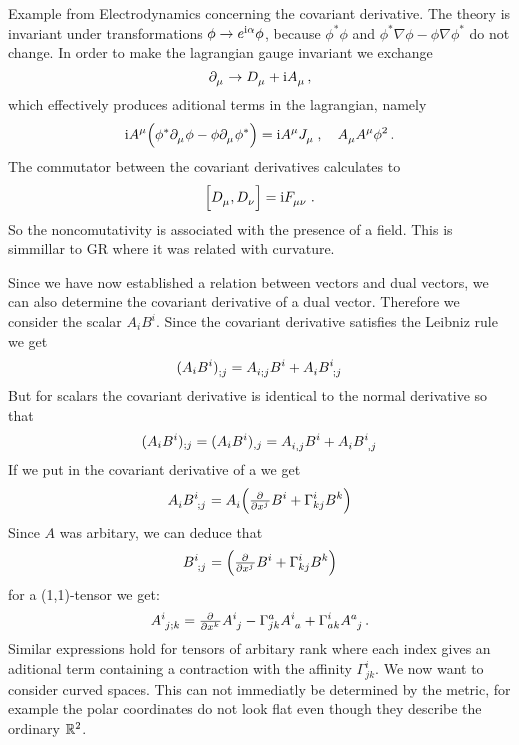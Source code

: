 \begin{remark} Example from Electrodynamics concerning the covariant derivative. 
The theory is invariant under transformations $\phi\to e^{\mathrm{i} \alpha}\phi$, 
because $\phi^*\phi$ and $\phi^*\nabla\phi-\phi\nabla\phi^*$ do not change.
In order to make the lagrangian gauge invariant we exchange
\begin{equation}
\tensor{\partial}{_\mu}\to\tensor{D}{_\mu}+\imI\tensor{A}{_\mu}\, ,
\end{equation}
which effectively produces aditional terms in the lagrangian, namely
\begin{equation}
\imI\tensor{A}{^\mu}\left(\phi^*\tensor{\partial}{_\mu}\phi
-\phi\tensor{\partial}{_\mu}\phi^*\right)=\imI\tensor{A}{^\mu}\tensor{J}{_\mu}\,,
\quad\tensor{A}{_\mu}\tensor{A}{^\mu}\phi^2\,.
\end{equation}
The commutator between the covariant derivatives calculates to  
\begin{equation}
\left[\tensor{D}{_\mu},\tensor{D}{_\nu}\right]=\imI \tensor{F}{_\mu_\nu}\,.
\end{equation}
So the noncomutativity is associated with the presence of a field. This is
simmillar to GR where it was related with curvature. 
\end{remark}
Since we have now established a relation between vectors and dual vectors, we
can also determine the covariant derivative of a dual vector. Therefore we
consider the scalar $A_iB^i$. Since the covariant derivative satisfies the
Leibniz rule we get
\begin{align}
\tensor{(A_iB^i)}{_{;j}} =
\tensor{A}{_i_;_j}\tensor{B}{^i}+\tensor{A}{_i}\tensor{B}{^i_;_j}
\end{align}
But for scalars the covariant derivative is identical to the normal derivative
so that 
\begin{align}
(A_iB^i)_{;j} =(A_iB^i)_{,j}=
\tensor{A}{_i_,_j}\tensor{B}{^i}+\tensor{A}{_i}\tensor{B}{^i_,_j}
\end{align}
If we put in the covariant derivative of a we get 
\begin{equation}
\tensor{A}{_i}\tensor{B}{^i_;_j}=\tensor{A}{_i}\left(\pd{}{{x^j}}B^i+\Gamma^i_{kj}\tensor{B}{^k}\right)
\end{equation}
Since $A$ was arbitary, we can deduce that
\begin{equation}
\tensor{B}{^i_;_j}=\left(\pd{}{{x^j}}B^i+\Gamma^i_{kj}\tensor{B}{^k}\right)
\end{equation}
for a (1,1)-tensor we get:
\begin{equation}
\tensor{A}{^i_j_;_k}=\pd{}{{x^k}}\tensor{A}{^i_j}-\Gamma^a_{jk}\tensor{A}{^i_a}+\Gamma^i_{ak}\tensor{A}{^a_j}\,
.\end{equation}
Similar expressions hold for tensors of arbitary rank where each index gives an
aditional term containing a contraction with the affinity $\Gamma^i_{jk}$. 
We now want to consider curved spaces. This can not immediatly be determined by
the metric, for example the polar coordinates do not look flat even though they
describe the ordinary $\mathbb{R}^2$.
